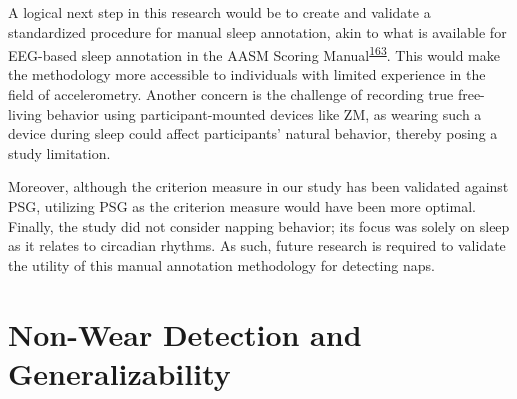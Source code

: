 \documentclass[
  10pt,
]{scrbook}
\begin{document}
A logical next step in this research would be to create and validate a
standardized procedure for manual sleep annotation, akin to what is
available for EEG-based sleep annotation in the AASM Scoring
Manual\textsuperscript{\protect\hyperlink{ref-aasm}{163}}. This would
make the methodology more accessible to individuals with limited
experience in the field of accelerometry. Another concern is the
challenge of recording true free-living behavior using
participant-mounted devices like ZM, as wearing such a device during
sleep could affect participants' natural behavior, thereby posing a
study limitation.

Moreover, although the criterion measure in our study has been validated
against PSG, utilizing PSG as the criterion measure would have been more
optimal. Finally, the study did not consider napping behavior; its focus
was solely on sleep as it relates to circadian rhythms. As such, future
research is required to validate the utility of this manual annotation
methodology for detecting naps.

\hypertarget{non-wear-detection-and-generalizability}{%
\section{Non-Wear Detection and
Generalizability}\label{non-wear-detection-and-generalizability}}
\end{document}
